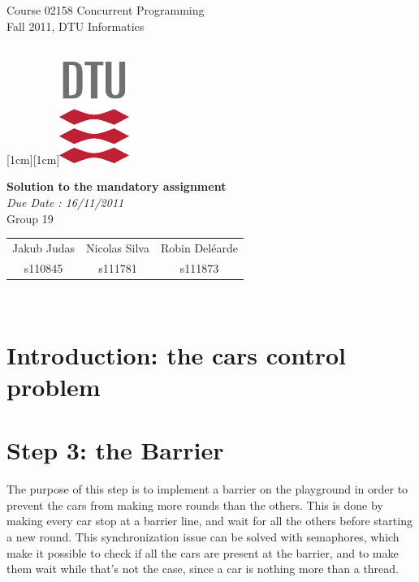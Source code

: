 \documentclass[a4paper,12pt,twoside]{article}
\begin{document}
\noindent\parbox[t]{9cm}{\textsf{Course 02158 Concurrent Programming\\
Fall 2011, DTU Informatics }}
\hfill
\parbox[t]{1cm}{\mbox{}\\
\raisebox{0.0cm}[1cm][1cm]{\includegraphics[origin=lb]{dtu_logo_cmyk.pdf}}}

\vspace{2cm}

\begin{center}
{\Large \bf Solution to the mandatory assignment}\\
\vspace{0.3cm}
{\it Due Date : 16/11/2011}\\
\vspace{1cm}
{\Large Group 19}\\
\vspace{0.3cm}
\begin{tabular}{ccc}
{\large Jakub Judas}&{\large Nicolas Silva}&{\large Robin Del\'earde}\\
s110845&s111781&s111873
\end{tabular}\\
\end{center}

\newpage

\section{Introduction: the cars control problem}




\section{Step 3: the Barrier}

The purpose of this step is to implement a barrier on the playground in order to prevent the cars from making more rounds than the others. This is done by making every car stop at a barrier line, and wait for all the others before starting a new round. This synchronization issue can be solved with semaphores, which make it possible to check if all the cars are present at the barrier, and to make them wait while that's not the case, since a car is nothing more than a thread.
\end{document}
